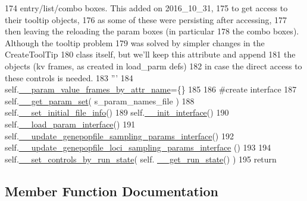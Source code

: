 \begin{DoxyCode}
174 \textcolor{stringliteral}{        entry/list/combo boxes.  This added on 2016\_10\_31, }
175 \textcolor{stringliteral}{        to get access to their tooltip objects,         }
176 \textcolor{stringliteral}{        as some of these were persisting after accessing,}
177 \textcolor{stringliteral}{        then leaving the reloading the param boxes (in particular}
178 \textcolor{stringliteral}{        the combo boxes). Although the tooltip problem}
179 \textcolor{stringliteral}{        was solved by simpler changes in the CreateToolTip}
180 \textcolor{stringliteral}{        class itself, but we'll keep this attribute and append}
181 \textcolor{stringliteral}{        the objects (kv frames, as created in load\_parm defs)}
182 \textcolor{stringliteral}{        in case the direct access to these controls is needed.}
183 \textcolor{stringliteral}{        '''}
184         self.\hyperlink{classnegui_1_1temp_1_1PGGuiNeEstimator_abe1bc53ec97be2cb815df143f3a09e87}{\_\_param\_value\_frames\_by\_attr\_name}=\{\}
185 
186         \textcolor{comment}{#create interface}
187         self.\hyperlink{classnegui_1_1temp_1_1PGGuiNeEstimator_a2607a5f7f6f2a05f4f6a2411ae86f5d7}{\_\_get\_param\_set}( s\_param\_names\_file )
188         self.\hyperlink{classnegui_1_1temp_1_1PGGuiNeEstimator_a509a4f44be0fbc5ce89c748e5d11cb28}{\_\_set\_initial\_file\_info}()
189         self.\hyperlink{classnegui_1_1temp_1_1PGGuiNeEstimator_a20a250d5a9897938c1d2b28b6e261273}{\_\_init\_interface}()
190         self.\hyperlink{classnegui_1_1temp_1_1PGGuiNeEstimator_aa2f70998cca9527b2dfd178d6a55dce7}{\_\_load\_param\_interface}()
191         self.\hyperlink{classnegui_1_1temp_1_1PGGuiNeEstimator_a37fd050843259e8a0a6e2996292c42c7}{\_\_update\_genepopfile\_sampling\_params\_interface}()
192         self.\hyperlink{classnegui_1_1temp_1_1PGGuiNeEstimator_a9ea70a6bcd83660afcbc6eae87685024}{\_\_update\_genepopfile\_loci\_sampling\_params\_interface}
      ()
193         
194         self.\hyperlink{classnegui_1_1temp_1_1PGGuiNeEstimator_a566035a7a99d6cfc22759fa764e0d072}{\_\_set\_controls\_by\_run\_state}( self.
      \hyperlink{classnegui_1_1temp_1_1PGGuiNeEstimator_a274579275f6628b01bf4f9fad852ef01}{\_\_get\_run\_state}() )
195         \textcolor{keywordflow}{return}
\end{DoxyCode}


\subsection{Member Function Documentation}

